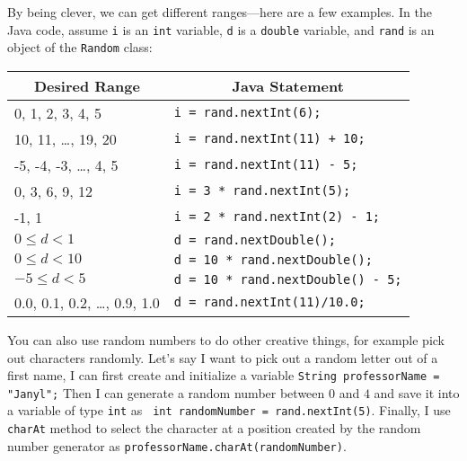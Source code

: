 By being clever, we can get different ranges---here are a few
examples. In the Java code, assume {\tt i} is an {\tt int} variable,
{\tt d} is a {\tt double} variable, and {\tt rand} is an object of the
{\tt Random} class:
\begin{center}
\begin{tabular}{p{2.5in}p{3.5in}}
\multicolumn{1}{c}{\bf Desired Range} & \multicolumn{1}{c}{\bf Java
Statement}\\\hline
0, 1, 2, 3, 4, 5 & \verb$i = rand.nextInt(6);$\\
10, 11, \ldots, 19, 20 & \verb$i = rand.nextInt(11) + 10;$\\
-5, -4, -3, \ldots, 4, 5 & \verb$i = rand.nextInt(11) - 5;$\\
0, 3, 6, 9, 12 & \verb$i = 3 * rand.nextInt(5);$\\
-1, 1 & \verb$i = 2 * rand.nextInt(2) - 1;$\\
$0 \leq d < 1$ & \verb$d = rand.nextDouble();$\\
$0 \leq d < 10$ & \verb$d = 10 * rand.nextDouble();$\\
$-5 \leq d < 5$ & \verb$d = 10 * rand.nextDouble() - 5;$\\
0.0, 0.1, 0.2, \ldots, 0.9, 1.0 & \verb$d = rand.nextInt(11)/10.0;$
\end{tabular}
\end{center}

You can also use random numbers to do other creative things, for example pick out characters randomly. Let's say I want
to pick out a random letter out of a first name, I can first create and initialize a variable {\tt{String professorName =
"Janyl";}} Then I can generate a random number between $0$ and $4$ and save it into a variable of type {\tt int} as
{\tt{ int randomNumber = rand.nextInt(5)}}. Finally, I  use {\tt{charAt}} method to select the character at a position
created by the random number generator as {\tt{professorName.charAt(randomNumber)}}. 


